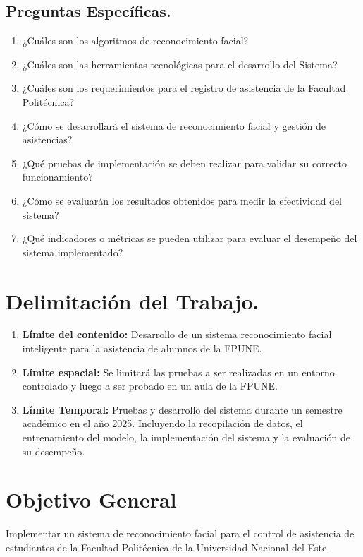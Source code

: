 \subsection{Preguntas Específicas.}
\begin{enumerate}
    \item ¿Cuáles son los algoritmos de reconocimiento facial?
    \item ¿Cuáles son las herramientas tecnológicas para el desarrollo del Sistema?
    \item ¿Cuáles son los requerimientos para el registro de asistencia de la Facultad Politécnica?
    \item ¿Cómo se desarrollará el sistema de reconocimiento facial y gestión de asistencias?
    \item ¿Qué pruebas de implementación se deben realizar para validar su correcto funcionamiento?
    \item ¿Cómo se evaluarán los resultados obtenidos para medir la efectividad del sistema?
    \item ¿Qué indicadores o métricas se pueden utilizar para evaluar el desempeño del sistema implementado?
\end{enumerate}

\section{Delimitación del Trabajo.}
\begin{enumerate}
    \item \textbf{Límite del contenido:} Desarrollo de un sistema reconocimiento facial
    inteligente para la asistencia de alumnos de la FPUNE.
    \item \textbf{Límite espacial:} Se limitará las pruebas a ser realizadas en un entorno
    controlado y luego a ser probado en un aula de la FPUNE.
    \item \textbf{Límite Temporal:} Pruebas y desarrollo del sistema durante un semestre
    académico en el año 2025. Incluyendo la recopilación de datos, el entrenamiento del modelo, la implementación del sistema y la evaluación de
    su desempeño.
\end{enumerate}



\section{Objetivo General}
Implementar un sistema de reconocimiento facial para el control de asistencia de estudiantes de la Facultad Politécnica de la Universidad Nacional del Este.

